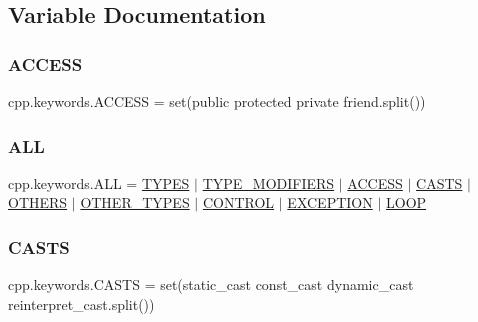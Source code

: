 \subsection{Variable Documentation}
\mbox{\label{namespacecpp_1_1keywords_a786f41bbea982641425c819d10bb2064}} 
\subsubsection{\texorpdfstring{ACCESS}{ACCESS}}
{\footnotesize\ttfamily cpp.\+keywords.\+A\+C\+C\+E\+SS = set(\textquotesingle{}public protected private friend\textquotesingle{}.split())}

\mbox{\label{namespacecpp_1_1keywords_a2e8727b78fb9434c99ac8518c6dd1ecc}} 
\subsubsection{\texorpdfstring{ALL}{ALL}}
{\footnotesize\ttfamily cpp.\+keywords.\+A\+LL = \mbox{\hyperlink{namespacecpp_1_1keywords_a56fd5baf357970548e1ec366edfc2c13}{T\+Y\+P\+ES}} $\vert$ \mbox{\hyperlink{namespacecpp_1_1keywords_af9282ce418d6b4b43dca5ed574caedd7}{T\+Y\+P\+E\+\_\+\+M\+O\+D\+I\+F\+I\+E\+RS}} $\vert$ \mbox{\hyperlink{namespacecpp_1_1keywords_a786f41bbea982641425c819d10bb2064}{A\+C\+C\+E\+SS}} $\vert$ \mbox{\hyperlink{namespacecpp_1_1keywords_aeba38dc38e188040f4ec44ba05092e7f}{C\+A\+S\+TS}} $\vert$ \mbox{\hyperlink{namespacecpp_1_1keywords_a15fe231fbad145538b73892804898809}{O\+T\+H\+E\+RS}} $\vert$ \mbox{\hyperlink{namespacecpp_1_1keywords_aa86a5e35a3ace14022a5ca1b91baf207}{O\+T\+H\+E\+R\+\_\+\+T\+Y\+P\+ES}} $\vert$ \mbox{\hyperlink{namespacecpp_1_1keywords_a374dfe9c96681079802ba4724287b8ff}{C\+O\+N\+T\+R\+OL}} $\vert$ \mbox{\hyperlink{namespacecpp_1_1keywords_a2665fb8a25a4dae03fa5d3dc975c537c}{E\+X\+C\+E\+P\+T\+I\+ON}} $\vert$ \mbox{\hyperlink{namespacecpp_1_1keywords_af0164c05398a2291487b76414102d555}{L\+O\+OP}}}

\mbox{\label{namespacecpp_1_1keywords_aeba38dc38e188040f4ec44ba05092e7f}} 
\subsubsection{\texorpdfstring{CASTS}{CASTS}}
{\footnotesize\ttfamily cpp.\+keywords.\+C\+A\+S\+TS = set(\textquotesingle{}static\+\_\+cast const\+\_\+cast dynamic\+\_\+cast reinterpret\+\_\+cast\textquotesingle{}.split())}


